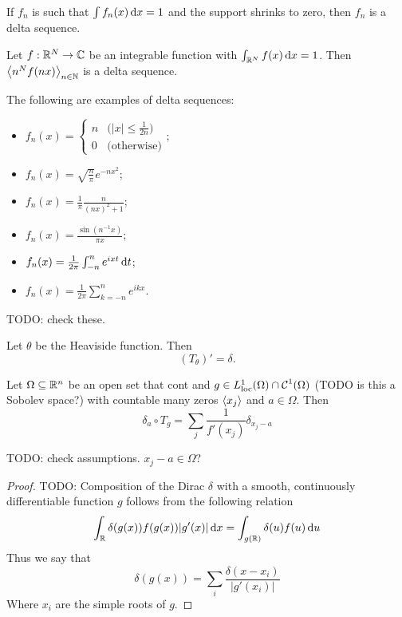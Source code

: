 \begin{lemma}
If $f_n$ is such that $\int f_n(x) \operatorname{d \!}{x} = 1$ and the support shrinks to zero, then $f_n$ is a delta sequence.
\end{lemma}

\begin{lemma}
Let $f: \mathbb{R}^N\to\mathbb{C}$ be an integrable function with $\int_{\mathbb{R}^N}f(x)\operatorname{d \!}{x} = 1$. Then $\left\langle n^Nf(nx) \right\rangle_{n\in \mathbb{N}}$ is a delta sequence.
\end{lemma}

\begin{example}
The following are examples of delta sequences:
\begin{itemize}
\item $f_n(x) = \begin{cases}
n & \big(|x| \leq \frac{1}{2n}\big) \\ 0 & \big(\text{otherwise}\big)
\end{cases}$;
\item $f_n(x) = \sqrt{\frac{n}{\pi}}e^{-nx^2}$;
\item $f_n(x) = \frac{1}{\pi} \frac{n}{(nx)^2 + 1}$;
\item $f_n(x) = \frac{\sin(n^{-1}x)}{\pi x}$;
\item $f_n(x) = \frac{1}{2\pi}\int_{-n}^n e^{ixt}\operatorname{d \!}{t}$;
\item $f_n(x) = \frac{1}{2\pi} \sum_{k = -n}^n e^{ikx}$.
\end{itemize}
TODO: check these.
\end{example}

\begin{proposition}
Let $\theta$ be the Heaviside function. Then
\[ (T_\theta)' = \delta. \]
\end{proposition}

\begin{proposition}
Let $\Omega\subseteq \mathbb{R}^n$ be an open set that cont and $g\in L^1_\text{loc}(\Omega)\cap \operatorname{\mathcal{C}}^1(\Omega)$ (TODO is this a Sobolev space?) with countable many zeros $\left\langle x_j \right\rangle$ and $a\in \Omega$. Then
\[ \delta_a \circ T_g = \sum_{j} \frac{1}{f'(x_j)}\delta_{x_j - a} \]
\end{proposition}
TODO: check assumptions. $x_j - a \in \Omega$?
\begin{proof}
TODO:
Composition of the Dirac $\delta$ with a smooth, continuously differentiable function $g$ follows from the following relation
\[ \int_{\mathbb{R}} \delta(g(x))f(g(x))|g'(x)|\operatorname{d \!}{x} = \int_{g(\mathbb{R})} \delta(u)f(u)\operatorname{d \!}{u} \]
Thus we say that
\[ \delta(g(x)) = \sum_i \frac{\delta(x-x_i)}{|g'(x_i)|}\]
Where $x_i$ are the simple roots of $g$.
\end{proof}

